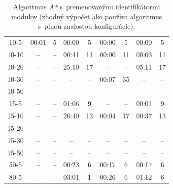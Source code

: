 \documentclass[
  printed, %
  oneside, %
  notable,   %
  nolof,     %
  nolot,     %
]{fithesis3}
\begin{document}
\begin{table}[hp!]
\begin{tabular}{c|cc|cc|cc|cc}
10-5  & 00:01 & 5  & 00:00 & 5  & \cellcolor{table-green}00:00 & \cellcolor{table-green}5  & 00:00 & 5  \\
10-10  & -- & --  & 00:41 & 11  & \cellcolor{table-green}00:00 & \cellcolor{table-green}11  & 00:03 & 11  \\
10-20  & -- & --  & 25:10 & 17  & -- & --  & \cellcolor{table-green}05:11 & \cellcolor{table-green}17  \\
10-30  & -- & --  & -- & --  & \cellcolor{table-green}00:07 & \cellcolor{table-green}35  & -- & --  \\
10-50  & -- & --  & -- & --  & -- & --  & -- & --  \\ \hline
15-5  & -- & --  & 01:06 & 9  & -- & --  & \cellcolor{table-green}00:01 & \cellcolor{table-green}9  \\
15-10  & -- & --  & 26:40 & 13  & \cellcolor{table-green}00:04 & \cellcolor{table-green}17  & 00:37 & 13  \\
15-20  & -- & --  & -- & --  & -- & --  & -- & --  \\
15-30  & -- & --  & -- & --  & -- & --  & -- & --  \\
15-50  & -- & --  & -- & --  & -- & --  & -- & --  \\ \hline
50-5  & -- & --  & 00:23 & 6  & \cellcolor{table-green}00:17 & \cellcolor{table-green}6  & 00:17 & 6  \\ \hline
80-5 & -- & -- & 03:01 & 1 & \cellcolor{table-green}00:26 & \cellcolor{table-green}6 & 01:12 & 6 \\
\end{tabular}%
\caption{Algoritmus \textit{A*} s~premenovanými identifikátormi modulov (zhodný výpočet ako používa algoritmus s~plnou znalosťou konfigurácie). }
\label{tab:astar-renamed}
\end{table}
\end{document}
